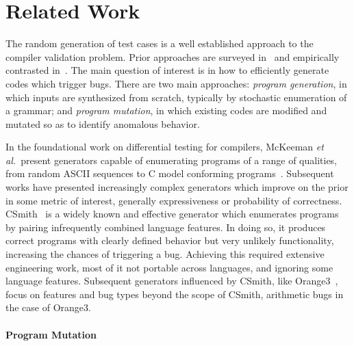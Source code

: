\section{Related Work}\label{sec:rw}



The random generation of test cases is a well established approach to the compiler validation problem. Prior approaches are surveyed in~\cite{Kossatchev2005,Boujarwah1997} and empirically contrasted in~\cite{Chen2014a}. The main question of interest is in how to efficiently generate codes which trigger bugs. There are two main approaches: \emph{program generation}, in which inputs are synthesized from scratch, typically by stochastic enumeration of a grammar; and \emph{program mutation}, in which existing codes are modified and mutated so as to identify anomalous behavior.

In the foundational work on differential testing for compilers, McKeeman \emph{et al.\ }present generators capable of enumerating programs of a range of qualities, from random ASCII sequences to C model conforming programs~\cite{McKeeman1998}. Subsequent works have presented increasingly complex generators which improve on the prior in some metric of interest, generally expressiveness or probability of correctness. CSmith~\cite{Yang2011} is a widely known and effective generator which enumerates programs by pairing infrequently combined language features. In doing so, it produces correct programs with clearly defined behavior but very unlikely functionality, increasing the chances of triggering a bug. Achieving this required extensive engineering work, most of it not portable across languages, and ignoring some language features. Subsequent generators influenced by CSmith, like Orange3~\cite{Nagai2013}, focus on features and bug types beyond the scope of CSmith, arithmetic bugs in the case of Orange3.

\paragraph{Program Mutation}


